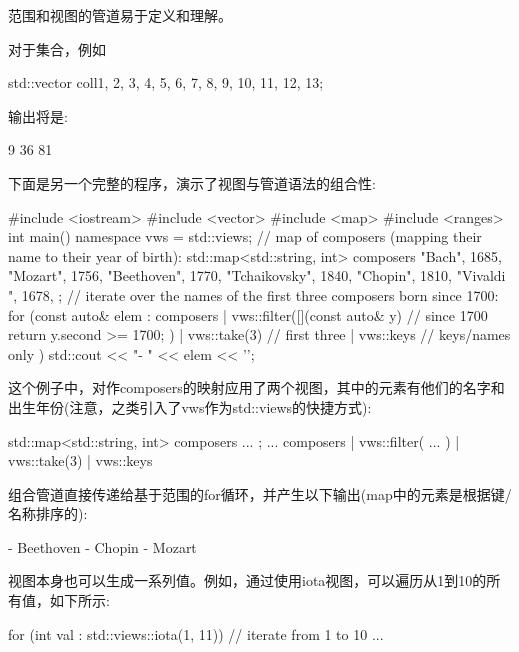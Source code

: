 范围和视图的管道易于定义和理解。

对于集合，例如

\begin{cpp}
std::vector coll{1, 2, 3, 4, 5, 6, 7, 8, 9, 10, 11, 12, 13};
\end{cpp}

输出将是:

\begin{shell}
9 36 81
\end{shell}

下面是另一个完整的程序，演示了视图与管道语法的组合性:


\begin{cpp}
#include <iostream>
#include <vector>
#include <map>
#include <ranges>
int main()
{
	namespace vws = std::views;
	// map of composers (mapping their name to their year of birth):
	std::map<std::string, int> composers{
		{"Bach", 1685},
		{"Mozart", 1756},
		{"Beethoven", 1770},
		{"Tchaikovsky", 1840},
		{"Chopin", 1810},
		{"Vivaldi ", 1678},
	};
	// iterate over the names of the first three composers born since 1700:
	for (const auto& elem : composers
		| vws::filter([](const auto& y) { // since 1700
			return y.second >= 1700;
		})
		| vws::take(3) // first three
		| vws::keys // keys/names only
	) {
		std::cout << "- " << elem << '\n';
	}
}
\end{cpp}

这个例子中，对作composers的映射应用了两个视图，其中的元素有他们的名字和出生年份(注意，之类引入了vws作为std::views的快捷方式):

\begin{cpp}
std::map<std::string, int> composers{ ... };
...
composers
	| vws::filter( ... )
	| vws::take(3)
	| vws::keys
\end{cpp}

组合管道直接传递给基于范围的for循环，并产生以下输出(map中的元素是根据键/名称排序的):

\begin{shell}
- Beethoven
- Chopin
- Mozart
\end{shell}


视图本身也可以生成一系列值。例如，通过使用iota视图，可以遍历从1到10的所有值，如下所示:

\begin{cpp}
for (int val : std::views::iota(1, 11)) { // iterate from 1 to 10
	...
}
\end{cpp}


